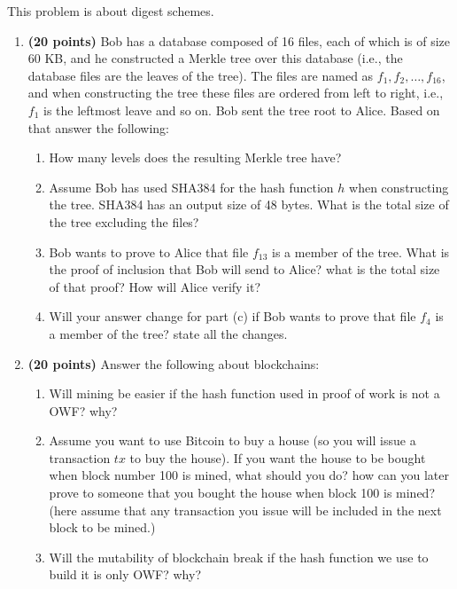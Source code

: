 \documentclass[12pt]{article}
\begin{document}
This problem is about digest schemes.
\begin{enumerate}
\item {\bf(20 points)} Bob has a database composed of 16 files, each of which is of size 60 KB, and he constructed a Merkle tree over this database (i.e., the database files are the leaves of the tree). The files are named as $f_1, f_2, \dots, f_{16}$, and when constructing the tree these files are ordered from left to right, i.e., $f_1$ is the leftmost leave and so on. Bob sent the tree root to Alice. Based on that answer the following:
\begin{enumerate}
    \item How many levels does the resulting Merkle tree have?
    
    \item Assume Bob has used SHA384 for the hash function $h$ when constructing the tree. SHA384 has an output size of 48 bytes. What is the total size of the tree excluding the files?
    
    \item Bob wants to prove to Alice that file $f_{13}$ is a member of the tree. What is the proof of inclusion that Bob will send to Alice? what is the total size of that proof? How will Alice verify it?
    
    \item Will your answer change for part (c) if Bob wants to prove that file $f_4$ is a member of the tree? state all the changes.
\end{enumerate}

\item {\bf(20 points)} Answer the following about blockchains:
\begin{enumerate}
    \item Will mining be easier if the hash function used in proof of work is not a OWF? why?

    \item Assume you want to use Bitcoin to buy a house (so you will issue a transaction $tx$ to buy the house). If you want the house to be bought when block number 100 is mined, what should you do? how can you later prove to someone that you bought the house when block 100 is mined? (here assume that any transaction you issue will be included in the next block to be mined.) 
    
    \item Will the mutability of blockchain break if the hash function we use to build it is only OWF? why?
\end{enumerate}
 


\end{enumerate}
\end{document}
